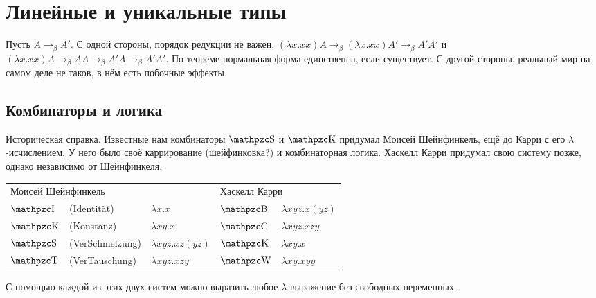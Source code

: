 \section{\texorpdfstring{Линейные и уникальные типы}{Linear and unique types}}

Пусть $A \rightarrow_\beta A'$.
С одной стороны, порядок редукции не важен, %
$(\lambda x . x x) A \rightarrow_\beta (\lambda x . x x) A' \rightarrow_\beta A' A'$
и $(\lambda x . x x) A \rightarrow_\beta A A \rightarrow_\beta A' A \rightarrow_\beta A' A'$.
По теореме  нормальная форма единственна, если существует.
С другой стороны, реальный мир на самом деле не таков, в нём есть побочные эффекты.

\subsection{\texorpdfstring{Комбинаторы и логика}{Combinators and logic}}

Историческая справка. Известные нам комбинаторы $\comb S$ и $\comb K$ придумал Моисей Шейнфинкель,
ещё до Карри с его $\lambda$-исчислением.
У него было своё каррирование (шейфинковка?) и комбинаторная логика.
Хаскелл Карри придумал свою систему позже, однако независимо от Шейнфинкеля.

\begin{center}
\begin{tabular}{l l l l l} \toprule
    \multicolumn{3}{l}{Моисей Шейнфинкель} & \multicolumn{2}{l}{Хаскелл Карри} \\ \cmidrule(r){1-3} \cmidrule(l){4-5}
    $\comb I$ & (Identität)     & $\lambda x . x$             & $\comb B$ & $\lambda x y z . x (y z)$ \\
    $\comb K$ & (Konstanz)      & $\lambda x y . x$           & $\comb C$ & $\lambda x y z . x z y$   \\
    $\comb S$ & (VerSchmelzung) & $\lambda x y z . x z (y z)$ & $\comb K$ & $\lambda x y . x$         \\
    $\comb T$ & (VerTauschung)  & $\lambda x y z . x z y$     & $\comb W$ & $\lambda x y . x y y$ \\ \bottomrule
\end{tabular} %
\end{center}

С помощью каждой из этих двух систем можно выразить любое $\lambda$-выражение без свободных переменных.


